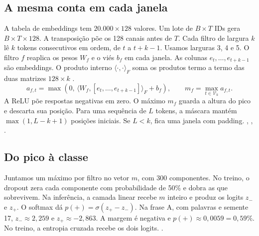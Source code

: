 \subsection{A mesma conta em cada janela}
A tabela de embeddings tem \(20.000\times128\) valores. Um lote de \(B\times T\)
IDs gera \(B\times T\times128\). A transposição põe os 128 canais antes de \(T\).
Cada filtro de
largura \(k\) lê \(k\) tokens consecutivos em ordem, de \(t\) a \(t+k-1\).
Usamos larguras 3, 4 e 5.
O filtro \(f\) reaplica os pesos \(W_f\) e o viés \(b_f\) em cada janela.
As colunas \(e_t,\ldots,e_{t+k-1}\) são embeddings. O produto interno
\(\langle\cdot,\cdot\rangle_F\) soma os produtos termo a termo das duas
matrizes \(128\times k\) \cite[cap.~10]{prince}.
\[
  a_{f,t}=\max\!\left(0,\,\langle W_f,[e_t,\ldots,e_{t+k-1}]\rangle_F+b_f\right),
  \qquad m_f=\max_{t\in\mathcal V_k} a_{f,t}.
\]
A ReLU põe respostas negativas em zero. O máximo \(m_f\) guarda a altura
do pico e descarta sua posição. Para uma sequência de \(L\) tokens, a
máscara mantém \(\max(1,L-k+1)\) posições iniciais. Se \(L<k\), fica uma janela com
padding. , ,
.

\subsection{Do pico à classe}
Juntamos um máximo por filtro no vetor \(m\), com 300 componentes. No
treino, o dropout zera cada componente com probabilidade de 50\% e
dobra as que sobrevivem. Na inferência, a camada linear recebe \(m\)
inteiro e produz os logits \(z_-\) e \(z_+\). O softmax dá
\(p(+)=\sigma(z_+-z_-)\). Na frase A, com palavras e semente 17,
\(z_-\approx2{,}259\) e \(z_+\approx-2{,}863\). A margem é negativa
e \(p(+)\approx0{,}0059=0{,}59\%\). No treino, a entropia cruzada recebe
os dois logits. .

